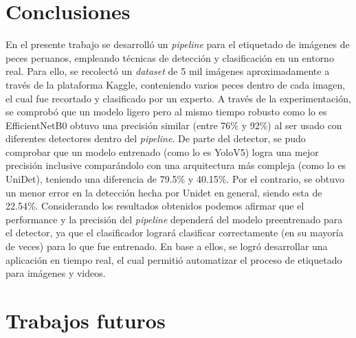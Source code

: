 \section{Conclusiones}
En el presente trabajo se desarrolló un \textit{pipeline} para el
etiquetado de imágenes de peces peruanos, empleando técnicas de detección y 
clasificación en un entorno real. Para ello, se recolectó un 
\textit{dataset} de 5 mil imágenes aproximadamente a través de la plataforma 
Kaggle, conteniendo varios peces dentro de cada imagen, el cual fue 
recortado y clasificado por un experto. 
A través de la experimentación, se comprobó que un modelo 
ligero pero al mismo tiempo robusto como lo es EfficientNetB0 obtuvo una 
precisión similar (entre 76\% y 92\%) al ser usado con diferentes detectores 
dentro del \textit{pipeline}. 
De parte del detector, se pudo comprobar que un modelo entrenado (como lo es YoloV5) 
logra una mejor precisión inclusive comparándolo con una arquitectura más compleja 
(como lo es UniDet), teniendo una diferencia de 79.5\% y 40.15\%. Por el contrario, 
se obtuvo un menor error en la detección hecha por Unidet en general, siendo esta de 
22.54\%. 
\newline
\newline
Considerando los resultados obtenidos podemos afirmar que el performance y 
la precisión del \textit{pipeline} dependerá del modelo preentrenado para el detector, 
ya que el clasificador logrará clasificar correctamente (en su mayoría de veces) para lo 
que fue entrenado. 
En base a ellos, se logró desarrollar una aplicación en tiempo real, el cual 
permitió automatizar el proceso de etiquetado para imágenes y videos.

\section{Trabajos futuros}

